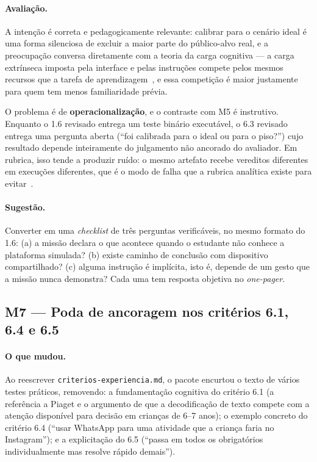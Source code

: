 \documentclass[11pt,a4paper]{article}
\newcommand{\cod}[1]{\texttt{\small #1}}
\begin{document}
\paragraph{Avaliação.} A intenção é correta e pedagogicamente relevante: calibrar para o cenário ideal é uma
forma silenciosa de excluir a maior parte do público-alvo real, e a preocupação conversa diretamente com a
teoria da carga cognitiva --- a carga extrínseca imposta pela interface e pelas instruções compete pelos
mesmos recursos que a tarefa de aprendizagem~\cite{sweller1988}, e essa competição é maior justamente para
quem tem menos familiaridade prévia.

O problema é de \textbf{operacionalização}, e o contraste com M5 é instrutivo. Enquanto o 1.6 revisado
entrega um teste binário executável, o 6.3 revisado entrega uma pergunta aberta (``foi calibrada para o
ideal ou para o piso?'') cujo resultado depende inteiramente do julgamento não ancorado do avaliador. Em
rubrica, isso tende a produzir ruído: o mesmo artefato recebe vereditos diferentes em execuções diferentes,
que é o modo de falha que a rubrica analítica existe para evitar~\cite{jonsson2007}.

\paragraph{Sugestão.} Converter em uma \textit{checklist} de três perguntas verificáveis, no mesmo formato
do 1.6: (a) a missão declara o que acontece quando o estudante não conhece a plataforma simulada?
(b) existe caminho de conclusão com dispositivo compartilhado? (c) alguma instrução é implícita, isto é,
depende de um gesto que a missão nunca demonstra? Cada uma tem resposta objetiva no \textit{one-pager}.

\subsection{M7 --- Poda de ancoragem nos critérios 6.1, 6.4 e 6.5}

\paragraph{O que mudou.} Ao reescrever \cod{criterios-experiencia.md}, o pacote encurtou o texto de vários
testes práticos, removendo: a fundamentação cognitiva do critério 6.1 (a referência a Piaget e o argumento
de que a decodificação de texto compete com a atenção disponível para decisão em crianças de 6--7 anos); o
exemplo concreto do critério 6.4 (``usar WhatsApp para uma atividade que a criança faria no Instagram'');
e a explicitação do 6.5 (``passa em todos os obrigatórios individualmente mas resolve rápido demais'').
\end{document}
